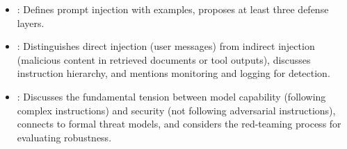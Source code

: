 \begin{interviewq}

\goodgreat
\begin{itemize}
\item {}: Defines prompt injection with examples, proposes at
  least three defense layers.
\item {}: Distinguishes direct injection (user messages) from
  indirect injection (malicious content in retrieved documents or tool
  outputs), discusses instruction hierarchy, and mentions monitoring and
  logging for detection.
\item {}: Discusses the fundamental tension between model
  capability (following complex instructions) and security (not following
  adversarial instructions), connects to formal threat models, and considers
  the red-teaming process for evaluating robustness.
\end{itemize}

\end{interviewq}

